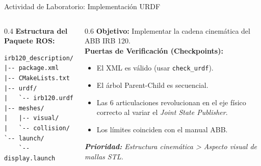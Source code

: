 \documentclass[aspectratio=169, table, xcdraw]{beamer}
\begin{document}
\begin{frame}[fragile]{Actividad de Laboratorio: Implementación URDF}
    \begin{columns}[T]
        \begin{column}{0.4\textwidth}
            \textbf{Estructura del Paquete ROS:}
\begin{lstlisting}[basicstyle=\ttfamily\tiny, backgroundcolor=\color{white}]
irb120_description/
|-- package.xml
|-- CMakeLists.txt
|-- urdf/
|   `-- irb120.urdf
|-- meshes/
|   |-- visual/
|   `-- collision/
`-- launch/
    `-- display.launch
\end{lstlisting}
        \end{column}
        
        \begin{column}{0.6\textwidth}
            \textbf{Objetivo:} Implementar la cadena cinemática del ABB IRB 120. \\
            \vspace{0.3cm}
            \textbf{Puertas de Verificación (Checkpoints):}
            \begin{itemize}
                \item[$\square$] El XML es válido (usar \texttt{check\_urdf}).
                \item[$\square$] El árbol Parent-Child es secuencial.
                \item[$\square$] Las 6 articulaciones revolucionan en el eje físico correcto al variar el \textit{Joint State Publisher}.
                \item[$\square$] Los límites coinciden con el manual ABB.
            \end{itemize}
            \vspace{0.2cm}
            \textit{\textbf{Prioridad:} Estructura cinemática > Aspecto visual de mallas STL.}
        \end{column}
    \end{columns}
\end{frame}
\end{document}
